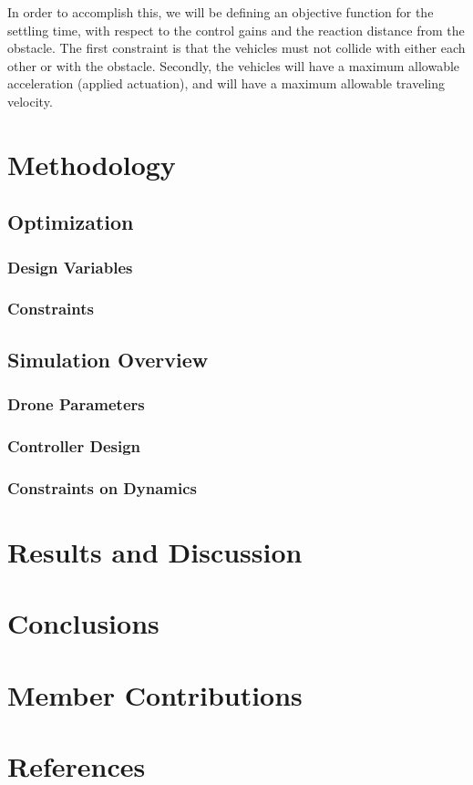 \documentclass[11pt]{article}
\begin{document}
In order to accomplish this, we will be defining an objective function for the settling time, with respect to the control gains and the reaction distance from the obstacle.  The first constraint is that the vehicles must not collide with either each other or with the obstacle.  Secondly, the vehicles will have a maximum allowable acceleration (applied actuation), and will have a maximum allowable traveling velocity.






\section{Methodology}
\subsection{Optimization}
\subsubsection{Design Variables}
\subsubsection{Constraints}


\subsection{Simulation Overview}
\subsubsection{Drone Parameters}
\subsubsection{Controller Design}
\subsubsection{Constraints on Dynamics}



\section{Results and Discussion}



\section{Conclusions}



\section{Member Contributions}



\section{References}
\end{document}
